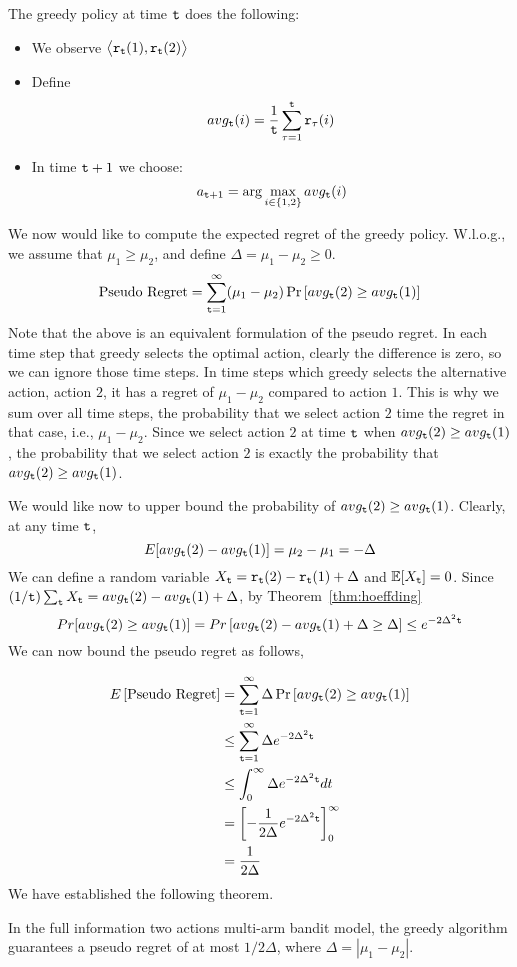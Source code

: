 The greedy policy at time ${\tt t}$ does the following:
\begin{itemize}
\item We observe $\big\langle {\tt r}_{{\tt t}}(1),{\tt r}_{{\tt t}}(2)\big\rangle$
\item Define
\[
avg_{{\tt t}}(i)=\frac{1}{{\tt t}} \sum_{\tau=1}^{{\tt t}}{\tt r}_{\tau}(i)
\]
\item In time ${\tt t}+1$ we choose:
\[
a_{{\tt t}+1}=\arg\max_{i\in\{1,2\}}avg_{{\tt t}}(i)
\]
\end{itemize}


We now would like to compute the expected regret of the greedy
policy. W.l.o.g., we assume that $\mu_{1}\ge\mu_{2}$, and define
$\Delta=\mu_{1}-\mu_{2}\ge0$.
\[
\text{Pseudo Regret}= \sum_{{\tt t}=1}^{\infty}(\mu_{1}-\mu_{2})
\Pr\left[avg_{{\tt t}}(2)\ge avg_{{\tt t}}(1)\right]
\]
Note that the above is an equivalent formulation of the pseudo regret. In each time step that greedy selects the optimal action, clearly the difference is zero, so we can ignore those time steps. In time steps which greedy selects the alternative action, action $2$, it has a regret of $\mu_1-\mu_2$ compared to action $1$. This is why we sum over all time steps, the probability that we select action $2$ time the regret in that case, i.e., $\mu_1-\mu_2$. Since we select action $2$ at time ${\tt t}$ when $avg_{{\tt t}}(2)\ge avg_{{\tt t}}(1)$, the probability that we select action $2$ is  exactly the probability that $avg_{{\tt t}}(2)\ge avg_{{\tt t}}(1)$.

We would like now to upper bound the probability of $avg_{{\tt t}}(2)\ge avg_{{\tt t}}(1)$. 
Clearly, at any time ${\tt t}$,
\[
E[avg_{{\tt t}}(2)-avg_{{\tt t}}(1)]=\mu_{2}-\mu_{1}=-\Delta
\]
We can define a random variable $X_{{\tt t}}={\tt r}_{{\tt t}}(2)-{\tt r}_{{\tt t}}(1)+\Delta$ and
$\mathbb{E}[X_{{\tt t}}]=0$. Since $(1/{\tt t})\sum_{{\tt t}} X_{{\tt t}} = avg_{{\tt t}}(2)- avg_{{\tt t}}(1)+\Delta$, by
Theorem~\ref{thm:hoeffding}
\[
Pr[avg_{\tt t}(2)\geq avg_{\tt t}(1)]= Pr\left[avg_{{\tt t}}(2)-avg_{{\tt t}}(1)+\Delta
\ge\Delta\right]\le e^{-2\Delta^{2}{\tt t}}
\]
We can now bound the pseudo regret as follows,

\begin{align*}
E\left[\text{Pseudo Regret}\right] & = 
 \sum_{{\tt t}=1}^{\infty}\Delta\Pr\left[avg_{\tt t}(2)\geq avg_{\tt t}(1)\right]\\
 & \le   \sum_{{\tt t}=1}^{\infty}\Delta e^{-2\Delta^{2}{\tt t}}\\
 & \le  \int_{0}^{\infty}\Delta e^{-2\Delta^{2}{\tt t}}dt\\
 & =  \left[-\frac{1}{2\Delta}e^{-2\Delta^{2}{\tt t}}\right]_{0}^{\infty}\\
 & =  \frac{1}{2\Delta}
\end{align*}
We have established the following theorem.
\begin{theorem}
In the full information two actions multi-arm bandit model, the greedy algorithm guarantees a pseudo regret of at most $1/2\Delta$, where $\Delta=|\mu_1-\mu_2|$.
\end{theorem}

